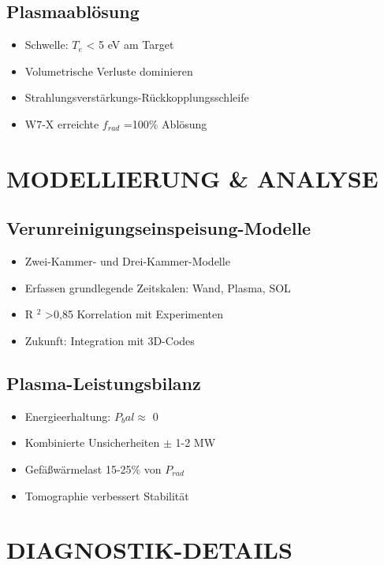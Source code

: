 \documentclass[11pt,a4paper]{article}
\begin{document}
\subsection{Plasmaablösung}

\begin{itemize}
\item Schwelle: $ T_e $ < 5 eV am Target
\item Volumetrische Verluste dominieren
\item Strahlungsverstärkungs-Rückkopplungsschleife
\item W7-X erreichte $ f_{rad} $ =100\% Ablösung
\end{itemize}

\section{MODELLIERUNG \& ANALYSE}

\subsection{Verunreinigungseinspeisung-Modelle}

\begin{itemize}
\item Zwei-Kammer- und Drei-Kammer-Modelle
\item Erfassen grundlegende Zeitskalen: Wand, Plasma, SOL
\item R $ ^2 $ >0,85 Korrelation mit Experimenten
\item Zukunft: Integration mit 3D-Codes
\end{itemize}

\subsection{Plasma-Leistungsbilanz}

\begin{itemize}
\item Energieerhaltung: $ P_bal\approx $ 0
\item Kombinierte Unsicherheiten $\pm $ 1-2 MW
\item Gefäßwärmelast 15-25\% von $ P_{rad} $
\item Tomographie verbessert Stabilität
\end{itemize}

\section{DIAGNOSTIK-DETAILS}
\end{document}
